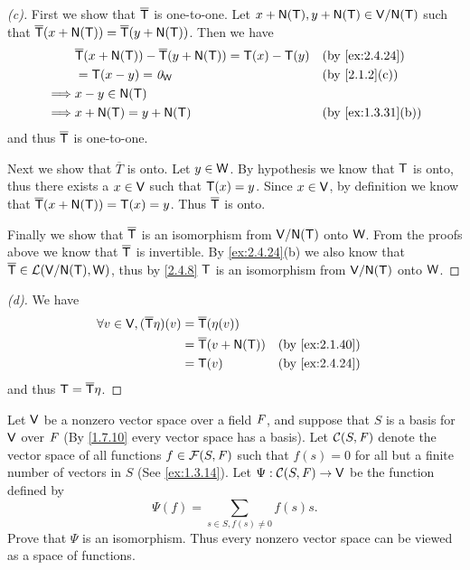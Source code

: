 \begin{proof}[(c)]
  First we show that \(\overline{\mathsf{T}}\) is one-to-one.
  Let \(x + \ns{\T}, y + \ns{\T} \in \V / \ns{\T}\) such that \(\overline{\T}(x + \ns{\T}) = \overline{\T}(y + \ns{\T})\).
  Then we have
  \begin{align*}
             & \overline{\T}(x + \ns{\T}) - \overline{\T}(y + \ns{\T}) = \T(x) - \T(y) &  & \text{(by \cref{ex:2.4.24})}    \\
             & = \T(x - y) = \zv_{\W}                                                  &  & \text{(by \cref{2.1.2}(c))}     \\
    \implies & x - y \in \ns{\T}                                                                                            \\
    \implies & x + \ns{\T} = y + \ns{\T}                                               &  & \text{(by \cref{ex:1.3.31}(b))}
  \end{align*}
  and thus \(\overline{\mathsf{T}}\) is one-to-one.

  Next we show that \(\overline{T}\) is onto.
  Let \(y \in \mathsf{W}\).
  By hypothesis we know that \(\mathsf{T}\) is onto, thus there exists a \(x \in \mathsf{V}\) such that \(\mathsf{T}(x) = y\).
  Since \(x \in \mathsf{V}\), by definition we know that \(\overline{\T}(x + \ns{\T}) = \T(x) = y\).
  Thus \(\overline{\mathsf{T}}\) is onto.

  Finally we show that \(\overline{\mathsf{T}}\) is an isomorphism from \(\V / \ns{\T}\) onto \(\mathsf{W}\).
  From the proofs above we know that \(\overline{\mathsf{T}}\) is invertible.
  By \cref{ex:2.4.24}(b) we also know that \(\overline{\T} \in \ls(\V / \ns{\T}, \W)\), thus by \cref{2.4.8} \(\mathsf{T}\) is an isomorphism from \(\V / \ns{\T}\) onto \(\mathsf{W}\).
\end{proof}

\begin{proof}[(d)]
  We have
  \begin{align*}
    \forall v \in \V, (\overline{\T} \eta)(v) & = \overline{\T}(\eta(v))                                       \\
                                              & = \overline{\T}(v + \ns{\T}) &  & \text{(by \cref{ex:2.1.40})} \\
                                              & = \T(v)                      &  & \text{(by \cref{ex:2.4.24})}
  \end{align*}
  and thus \(\mathsf{T} = \overline{\mathsf{T}} \eta\).
\end{proof}

\begin{ex}\label{ex:2.4.25}
  Let \(\mathsf{V}\) be a nonzero vector space over a field \(\mathit{F}\), and suppose that \(S\) is a basis for \(\mathsf{V}\) over \(\mathit{F}\)
  (By \cref{1.7.10} every vector space has a basis).
  Let \(\mathcal{C}(S, \mathit{F})\) denote the vector space of all functions \(f \in \FS\) such that \(f(s) = 0\) for all but a finite number of vectors in \(S\)
  (See \cref{ex:1.3.14}).
  Let \(\Psi : \mathcal{C}(S, \mathit{F}) \to \mathsf{V}\) be the function defined by
  \[
    \Psi(f) = \sum_{s \in S, f(s) \neq 0} f(s) s.
  \]
  Prove that \(\Psi\) is an isomorphism.
  Thus every nonzero vector space can be viewed as a space of functions.
\end{ex}


